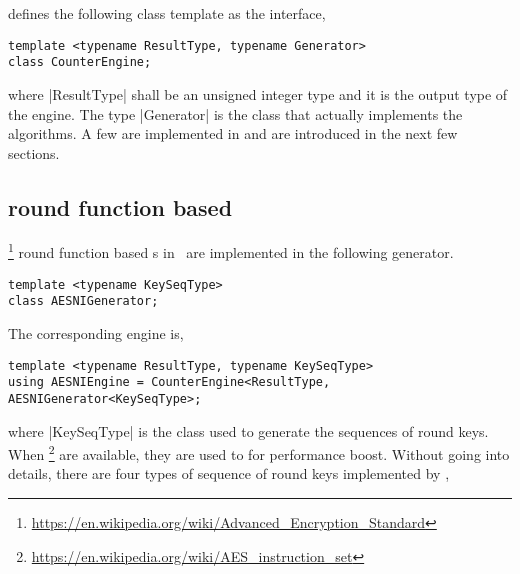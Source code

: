 \mckl defines the following class template as the interface,
\begin{verbatim}
template <typename ResultType, typename Generator>
class CounterEngine;
\end{verbatim}
where |ResultType| shall be an unsigned integer type and it is the output type
of the \rng engine. The type |Generator| is the class that actually implements
the algorithms. A few are implemented in \mckl and are introduced in the next
few sections.

\subsection{\texorpdfstring{\aes}{AES} round function based
\texorpdfstring{\rng}{RNG}}
\label{sub:AES-NI instructions based RNG}

\aes\footnote{\url{https://en.wikipedia.org/wiki/Advanced_Encryption_Standard}} round function based \rng{}s in~\cite{Salmon:2011um} are implemented in the following generator.
\begin{verbatim}
template <typename KeySeqType>
class AESNIGenerator;
\end{verbatim}
The corresponding \rng engine is,
\begin{verbatim}
template <typename ResultType, typename KeySeqType>
using AESNIEngine = CounterEngine<ResultType, AESNIGenerator<KeySeqType>;
\end{verbatim}
where |KeySeqType| is the class used to generate the sequences of round keys.
When \aesni\footnote{\url{https://en.wikipedia.org/wiki/AES_instruction_set}}
are available, they are used to for performance boost. Without going into
details, there are four types of sequence of round keys implemented by \mckl,

